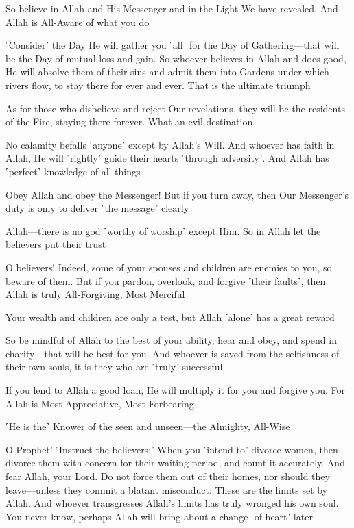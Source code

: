 So believe in Allah and His Messenger and in the Light We have revealed. And Allah is All-Aware of what you do

˹Consider˺ the Day He will gather you ˹all˺ for the Day of Gathering—that will be the Day of mutual loss and gain. So whoever believes in Allah and does good, He will absolve them of their sins and admit them into Gardens under which rivers flow, to stay there for ever and ever. That is the ultimate triumph

As for those who disbelieve and reject Our revelations, they will be the residents of the Fire, staying there forever. What an evil destination

No calamity befalls ˹anyone˺ except by Allah’s Will. And whoever has faith in Allah, He will ˹rightly˺ guide their hearts ˹through adversity˺. And Allah has ˹perfect˺ knowledge of all things

Obey Allah and obey the Messenger! But if you turn away, then Our Messenger’s duty is only to deliver ˹the message˺ clearly

Allah—there is no god ˹worthy of worship˺ except Him. So in Allah let the believers put their trust

O believers! Indeed, some of your spouses and children are enemies to you, so beware of them. But if you pardon, overlook, and forgive ˹their faults˺, then Allah is truly All-Forgiving, Most Merciful

Your wealth and children are only a test, but Allah ˹alone˺ has a great reward

So be mindful of Allah to the best of your ability, hear and obey, and spend in charity—that will be best for you. And whoever is saved from the selfishness of their own souls, it is they who are ˹truly˺ successful

If you lend to Allah a good loan, He will multiply it for you and forgive you. For Allah is Most Appreciative, Most Forbearing

˹He is the˺ Knower of the seen and unseen—the Almighty, All-Wise

O Prophet! ˹Instruct the believers:˺ When you ˹intend to˺ divorce women, then divorce them with concern for their waiting period, and count it accurately. And fear Allah, your Lord. Do not force them out of their homes, nor should they leave—unless they commit a blatant misconduct. These are the limits set by Allah. And whoever transgresses Allah’s limits has truly wronged his own soul. You never know, perhaps Allah will bring about a change ˹of heart˺ later

